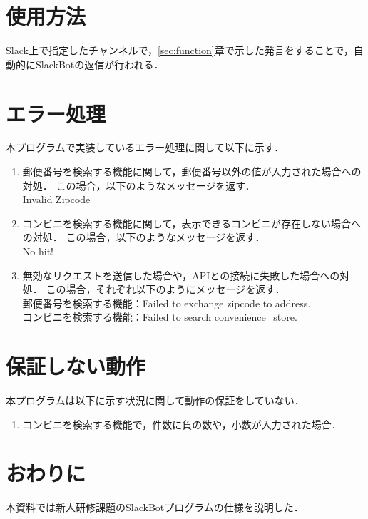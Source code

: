 \documentclass[12pt]{jsarticle}
\begin{document}
\section{使用方法}
Slack上で指定したチャンネルで，\ref{sec:function}章で示した発言をすることで，自動的にSlackBotの返信が行われる．

\section{エラー処理}
本プログラムで実装しているエラー処理に関して以下に示す．

\begin{enumerate}
  \item 郵便番号を検索する機能に関して，郵便番号以外の値が入力された場合への対処．
        この場合，以下のようなメッセージを返す．\\
        Invalid Zipcode
  \item コンビニを検索する機能に関して，表示できるコンビニが存在しない場合への対処．
        この場合，以下のようなメッセージを返す．\\
        No hit!
  \item 無効なリクエストを送信した場合や，APIとの接続に失敗した場合への対処．
        この場合，それぞれ以下のようにメッセージを返す．\\
        郵便番号を検索する機能：Failed to exchange zipcode to address.\\
        コンビニを検索する機能：Failed to search convenience\_store.
\end{enumerate}

\section{保証しない動作}
本プログラムは以下に示す状況に関して動作の保証をしていない．

\begin{enumerate}
  \item コンビニを検索する機能で，件数に負の数や，小数が入力された場合．
\end{enumerate}

\section{おわりに}
\label{sec:conclusion}
本資料では新人研修課題のSlackBotプログラムの仕様を説明した．

%
%
\end{document}
